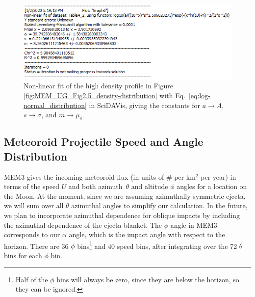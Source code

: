 \documentclass{hitec}
\numberwithin{equation}{section}
\begin{document}
\begin{figure}[h!]
	\centering
	\includegraphics[scale=0.85]{Fit-to-MEM_high_dens.PNG}
	\caption{Non-linear fit of the high density profile in Figure \ref{fig:MEM_UG_Fig2.5_density-distribution} with Eq.\ \ref{eq:log-normal_distribution} in \textsf{SciDAVis}, giving the constants for $a\rightarrow A$, $s\rightarrow \sigma$, and $m\rightarrow \mu_\delta$.}\label{fig:Fit-to-MEM_high_dens}
\end{figure}

\subsection{Meteoroid Projectile Speed and Angle Distribution}

MEM3 gives the incoming meteoroid flux (in units of \# per km$^2$ per year) in terms of the speed $U$ and both azimuth~$\theta$ and altitude $\phi$ angles for a location on the Moon. At the moment, since we are assuming azimuthally symmetric ejecta, we will sum over all $\theta$ azimuthal angles to simplify our calculation. In the future, we plan to incorporate azimuthal dependence for oblique impacts by including the azimuthal dependence of the ejecta blanket. The $\phi$ angle in MEM3 corresponds to our $\alpha$ angle, which is the impact angle with respect to the horizon. There are 36 $\phi$ bins\footnote{Half of the $\phi$ bins will always be zero, since they are below the horizon, so they can be ignored.} and 40 speed bins, after integrating over the 72 $\theta$ bins for each $\phi$ bin.


\end{document}
